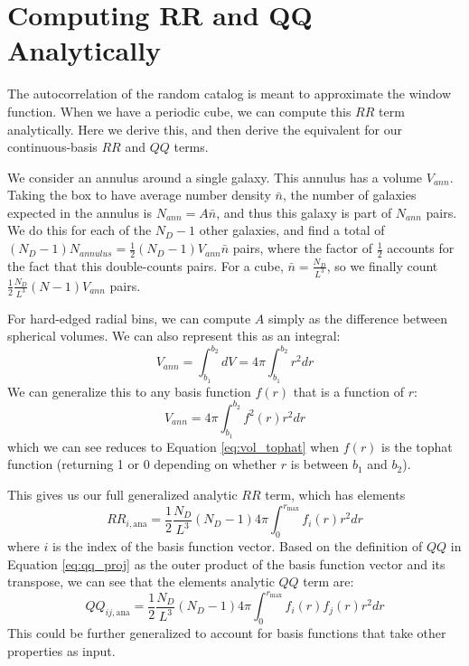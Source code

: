 \documentclass[modern]{aastex62}
\begin{document}
\section{Computing RR and QQ Analytically}\label{sec:analytic}

The autocorrelation of the random catalog is meant to approximate the window function. 
When we have a periodic cube, we can compute this $RR$ term analytically.
Here we derive this, and then derive the equivalent for our continuous-basis $RR$ and $QQ$ terms.

We consider an annulus around a single galaxy. 
This annulus has a volume $V_{ann}$.
Taking the box to have average number density $\bar{n}$, the number of galaxies expected in the annulus is $N_{ann} = A \bar{n}$, and thus this galaxy is part of $N_{ann}$ pairs.   
We do this for each of the $N_D-1$ other galaxies, and find a total of $(N_D-1) N_{annulus} = \frac{1}{2} (N_D-1) V_{ann} \bar{n}$ pairs, where the factor of $\frac{1}{2}$ accounts for the fact that this double-counts pairs.
For a cube, $\bar{n} = \frac{N_D}{L^3}$, so we finally count $\frac{1}{2} \frac{N_D}{L^3} (N-1) V_{ann}$ pairs.

For hard-edged radial bins, we can compute $A$ simply as the difference between spherical volumes. 
We can also represent this as an integral:
\begin{equation} \label{eq:vol_tophat}
V_{ann} = \int_{b_1}^{b_2} dV = 4\pi \int_{b_1}^{b_2} r^2 dr
\end{equation} 
We can generalize this to any basis function $f(r)$ that is a function of $r$:
\begin{equation}
V_{ann} = 4\pi  \int_{b_1}^{b_2} f^2(r) r^2 dr
\end{equation}
which we can see reduces to Equation \ref{eq:vol_tophat} when $f(r)$ is the tophat function (returning 1 or 0 depending on whether $r$ is between $b_1$ and $b_2$).

This gives us our full generalized analytic $RR$ term, which has elements
\begin{equation}
RR_{i,\text{ana}} = \frac{1}{2} \frac{N_D}{L^3} (N_D-1)  4\pi  \int_{0}^{r_\mathrm{max}} f_i(r) r^2 dr
\end{equation}
where $i$ is the index of the basis function vector.
Based on the definition of $QQ$ in Equation \ref{eq:qq_proj} as the outer product of the basis function vector and its transpose, we can see that the elements analytic $QQ$ term are:
\begin{equation}
QQ_{ij,\text{ana}} = \frac{1}{2} \frac{N_D}{L^3} (N_D-1)  4\pi  \int_{0}^{r_\mathrm{max}} f_i(r) f_j(r) r^2 dr
\end{equation}
This could be further generalized to account for basis functions that take other properties as input.
\end{document}
